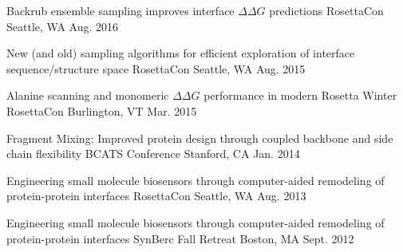 

\begin{cvhonors}

  \cvhonor
  {Backrub ensemble sampling improves interface $\Delta\Delta G$ predictions} %
  {RosettaCon} %
  {Seattle, WA} %
  {Aug. 2016} %

  \cvhonor
  {New (and old) sampling algorithms for efficient exploration of interface sequence/structure space} %
  {RosettaCon} %
  {Seattle, WA} %
  {Aug. 2015} %

  \cvhonor
  {Alanine scanning and monomeric $\Delta\Delta G$ performance in modern Rosetta} %
  {Winter RosettaCon} %
  {Burlington, VT} %
  {Mar. 2015} %

  \cvhonor
  {Fragment Mixing: Improved protein design through coupled backbone and side chain flexibility} %
  {BCATS Conference} %
  {Stanford, CA} %
  {Jan. 2014} %


  \cvhonor
  {Engineering small molecule biosensors through computer-aided remodeling of protein-protein interfaces} %
  {RosettaCon} %
  {Seattle, WA} %
  {Aug. 2013} %

  \cvhonor
  {Engineering small molecule biosensors through computer-aided remodeling of protein-protein interfaces} %
  {SynBerc Fall Retreat} %
  {Boston, MA} %
  {Sept. 2012} %

\end{cvhonors}
